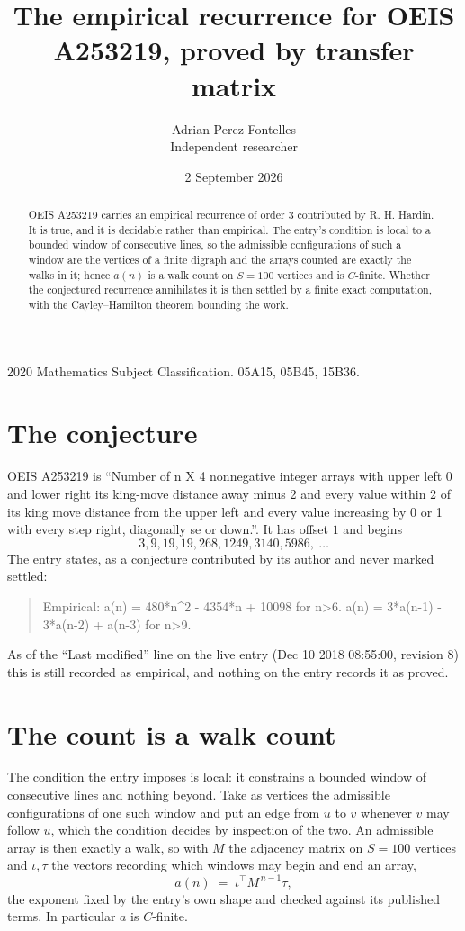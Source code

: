 \documentclass[11pt,a4paper]{article}
\title{The empirical recurrence for OEIS A253219, proved by transfer matrix}
\author{Adrian Perez Fontelles\\ \small Independent researcher}
\date{2 September 2026}
\theoremstyle{plain}
\theoremstyle{definition}
\begin{document}
\maketitle

\begin{abstract}
OEIS A253219 carries an empirical recurrence of order $3$ contributed by R. H. Hardin. It is
true, and it is decidable rather than empirical. The entry's condition is local to a bounded window of consecutive lines, so
the admissible configurations of such a window are the vertices of a finite digraph and the
arrays counted are exactly the walks in it; hence $a(n)$ is a walk count on $S=100$ vertices
and is $C$-finite. Whether the conjectured recurrence annihilates it is then settled by a
finite exact computation, with the Cayley--Hamilton theorem bounding the work.
\end{abstract}

\noindent\small 2020 Mathematics Subject Classification. 05A15, 05B45, 15B36.\normalsize

\section{The conjecture}

OEIS A253219 is ``Number of n X 4 nonnegative integer arrays with upper left 0 and lower right its king-move distance away minus 2 and every value within 2 of its king move distance from the upper left and every value increasing by 0 or 1 with every step right, diagonally se or down.''. It has offset $1$ and begins
\[
3, 9, 19, 19, 268, 1249, 3140, 5986,\ \dots
\]
The entry states, as a conjecture contributed by its author and never marked settled:
\begin{quote}
Empirical: a(n) = 480*n\^{}2 - 4354*n + 10098 for n>6. a(n) = 3*a(n-1) - 3*a(n-2) + a(n-3) for n>9.
\end{quote}
As of the ``Last modified'' line on the live entry (Dec 10 2018 08:55:00, revision 8) this is still
recorded as empirical, and nothing on the entry records it as proved.

\section{The count is a walk count}

The condition the entry imposes is local: it constrains a bounded window of consecutive lines and nothing beyond. Take as
vertices the admissible configurations of one such window and put an edge from $u$ to $v$
whenever $v$ may follow $u$, which the condition decides by inspection of the two. An
admissible array is then exactly a walk, so with $M$ the adjacency matrix on $S=100$ vertices
and $\iota,\tau$ the vectors recording which windows may begin and end an array,
\[
a(n)\;=\;\iota^{\!\top}M^{\,n-1}\tau ,
\]
the exponent fixed by the entry's own shape and checked against its published terms. In
particular $a$ is $C$-finite.
\end{document}
